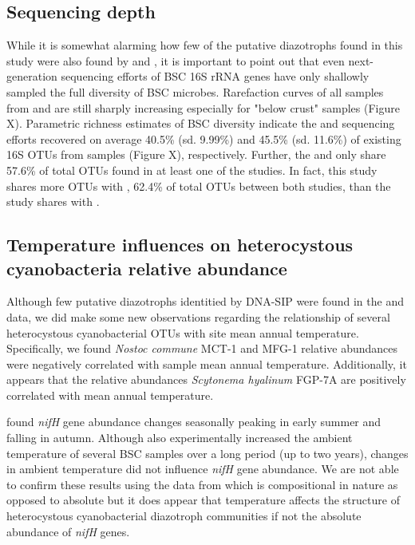 \subsection{Sequencing depth}
While it is somewhat alarming how few of the putative diazotrophs found in this study were also found by \citet{Garcia_Pichel_2013} and \citet{Steven_2013}, it is important to point out that even next-generation sequencing efforts of BSC 16S rRNA genes have only shallowly sampled the full diversity of BSC microbes. Rarefaction curves of all samples from \citet{Steven_2013} and \citet{Garcia_Pichel_2013} are still sharply increasing especially for "below crust" samples (Figure X). Parametric richness estimates of BSC diversity indicate the \citet{Steven_2013} and \citet{Garcia_Pichel_2013} sequencing efforts recovered on average 40.5\% (sd. 9.99\%) and 45.5\% (sd. 11.6\%) of existing 16S OTUs from samples (Figure X), respectively. Further, the \citet{Steven_2013} and \citet{Garcia_Pichel_2013} only share 57.6\% of total OTUs found in at least one of the studies. In fact, this study shares more OTUs with \citet{Steven_2013}, 62.4\% of total OTUs between both studies, than the \citet{Steven_2013} study shares with \citet{Garcia_Pichel_2013}. 

\subsection{Temperature influences on heterocystous cyanobacteria relative abundance}
Although few putative diazotrophs identitied by DNA-SIP were found in the \citet{Garcia_Pichel_2013} and \citet{Steven_2013} data, we did make some new observations regarding the relationship of several heterocystous cyanobacterial OTUs with site mean annual temperature. Specifically, we found \textit{Nostoc commune} MCT-1 and MFG-1 relative abundances were negatively correlated with sample mean annual temperature. Additionally, it appears that the relative abundances \textit{Scytonema hyalinum} FGP-7A  are positively correlated with mean annual temperature.

\citet{Yeager_2012} found \textit{nifH} gene abundance changes seasonally peaking in early summer and falling in autumn. Although \citet{Yeager_2013} also experimentally increased the ambient temperature of several BSC samples over a long period (up to two years), changes in ambient temperature did not influence \textit{nifH} gene abundance. We are not able to confirm these results using the data from \citet{Garcia_Pichel_2013} which is compositional in nature as opposed to absolute but it does appear that temperature affects the structure of heterocystous cyanobacterial diazotroph communities if not the absolute abundance of \textit{nifH} genes. 

